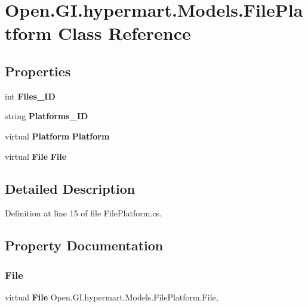 \section{Open.\+G\+I.\+hypermart.\+Models.\+File\+Platform Class Reference}
\label{class_open_1_1_g_i_1_1hypermart_1_1_models_1_1_file_platform}
\subsection*{Properties}
\begin{DoxyCompactItemize}
\item 
int \textbf{ Files\+\_\+\+ID}\hspace{0.3cm}{\ttfamily  [get, set]}
\item 
string \textbf{ Platforms\+\_\+\+ID}\hspace{0.3cm}{\ttfamily  [get, set]}
\item 
virtual \textbf{ Platform} \textbf{ Platform}\hspace{0.3cm}{\ttfamily  [get, set]}
\item 
virtual \textbf{ File} \textbf{ File}\hspace{0.3cm}{\ttfamily  [get, set]}
\end{DoxyCompactItemize}


\subsection{Detailed Description}


Definition at line 15 of file File\+Platform.\+cs.



\subsection{Property Documentation}
\mbox{\label{class_open_1_1_g_i_1_1hypermart_1_1_models_1_1_file_platform_aa9fd91411ba71f8dd77bdba062daecd3}} 
\subsubsection{File}
{\footnotesize\ttfamily virtual \textbf{ File} Open.\+G\+I.\+hypermart.\+Models.\+File\+Platform.\+File\hspace{0.3cm}{\ttfamily [get]}, {\ttfamily [set]}}



